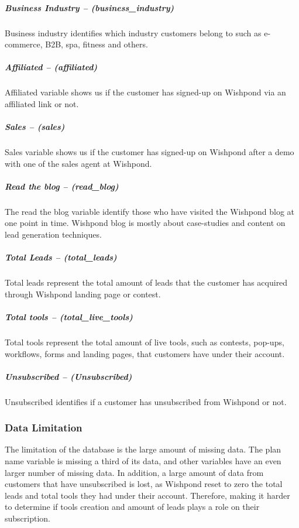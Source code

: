 \documentclass[]{article}
\let\oldsubparagraph\subparagraph
\renewcommand{\subparagraph}[1]{\oldsubparagraph{#1}\mbox{}}
\begin{document}
\subparagraph{Business Industry --
(business\_industry)}\label{business-industry-business_industry}

Business industry identifies which industry customers belong to such as
e-commerce, B2B, spa, fitness and others.

\subparagraph{Affiliated -- (affiliated)}\label{affiliated-affiliated}

Affiliated variable shows us if the customer has signed-up on Wishpond
via an affiliated link or not.

\subparagraph{Sales -- (sales)}\label{sales-sales}

Sales variable shows us if the customer has signed-up on Wishpond after
a demo with one of the sales agent at Wishpond.

\subparagraph{Read the blog --
(read\_blog)}\label{read-the-blog-read_blog}

The read the blog variable identify those who have visited the Wishpond
blog at one point in time. Wishpond blog is mostly about case-studies
and content on lead generation techniques.

\subparagraph{Total Leads --
(total\_leads)}\label{total-leads-total_leads}

Total leads represent the total amount of leads that the customer has
acquired through Wishpond landing page or contest.

\subparagraph{Total tools --
(total\_live\_tools)}\label{total-tools-total_live_tools}

Total tools represent the total amount of live tools, such as contests,
pop-ups, workflows, forms and landing pages, that customers have under
their account.

\subparagraph{Unsubscribed --
(Unsubscribed)}\label{unsubscribed-unsubscribed}

Unsubscribed identifies if a customer has unsubscribed from Wishpond or
not.

\subsubsection{Data Limitation}\label{data-limitation}

The limitation of the database is the large amount of missing data. The
plan name variable is missing a third of its data, and other variables
have an even larger number of missing data. In addition, a large amount
of data from customers that have unsubscribed is lost, as Wishpond reset
to zero the total leads and total tools they had under their account.
Therefore, making it harder to determine if tools creation and amount of
leads plays a role on their subscription.
\end{document}
